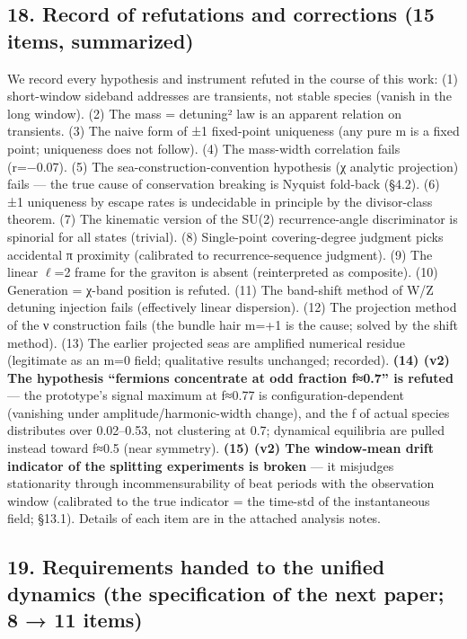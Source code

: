 \documentclass[
]{article}
\begin{document}
\subsection{18. Record of refutations and corrections (15 items,
summarized)}\label{record-of-refutations-and-corrections-15-items-summarized}

We record every hypothesis and instrument refuted in the course of this
work: (1) short-window sideband addresses are transients, not stable
species (vanish in the long window). (2) The mass = detuning² law is an
apparent relation on transients. (3) The naive form of ±1 fixed-point
uniqueness (any pure m is a fixed point; uniqueness does not follow).
(4) The mass-width correlation fails (r=−0.07). (5) The
sea-construction-convention hypothesis (χ analytic projection) fails ---
the true cause of conservation breaking is Nyquist fold-back (§4.2). (6)
±1 uniqueness by escape rates is undecidable in principle by the
divisor-class theorem. (7) The kinematic version of the SU(2)
recurrence-angle discriminator is spinorial for all states (trivial).
(8) Single-point covering-degree judgment picks accidental π proximity
(calibrated to recurrence-sequence judgment). (9) The linear \(\ell\)=2
frame for the graviton is absent (reinterpreted as composite). (10)
Generation = χ-band position is refuted. (11) The band-shift method of
W/Z detuning injection fails (effectively linear dispersion). (12) The
projection method of the ν construction fails (the bundle hair m=+1 is
the cause; solved by the shift method). (13) The earlier projected seas
are amplified numerical residue (legitimate as an m=0 field; qualitative
results unchanged; recorded). \textbf{(14) (v2) The hypothesis
``fermions concentrate at odd fraction f≈0.7'' is refuted} --- the
prototype's signal maximum at f≈0.77 is configuration-dependent
(vanishing under amplitude/harmonic-width change), and the f of actual
species distributes over 0.02--0.53, not clustering at 0.7; dynamical
equilibria are pulled instead toward f≈0.5 (near symmetry). \textbf{(15)
(v2) The window-mean drift indicator of the splitting experiments is
broken} --- it misjudges stationarity through incommensurability of beat
periods with the observation window (calibrated to the true indicator =
the time-std of the instantaneous field; §13.1). Details of each item
are in the attached analysis notes.

\subsection{19. Requirements handed to the unified dynamics (the
specification of the next paper; 8 → 11
items)}\label{requirements-handed-to-the-unified-dynamics-the-specification-of-the-next-paper-8-11-items}
\end{document}
